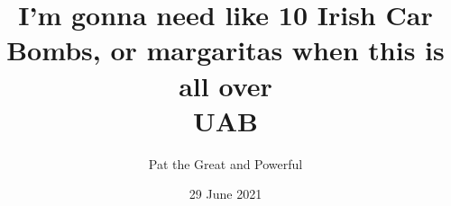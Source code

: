 \title{
{I'm gonna need like 10 Irish Car Bombs, or margaritas when this is all over}\\
{UAB}\\
}
\author{Pat the Great and Powerful}
\date{29 June 2021}
\maketitle